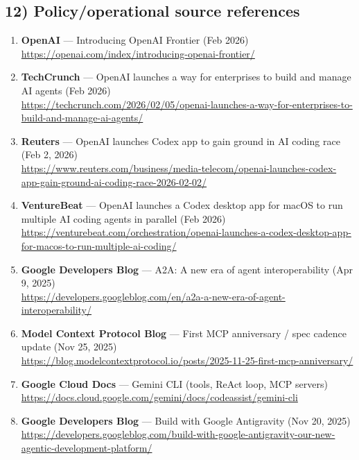 \documentclass[11pt]{article}
\begin{document}
\hypertarget{policyoperational-source-references}{%
\subsection{12) Policy/operational source
references}\label{policyoperational-source-references}}

\begin{enumerate}
\def\labelenumi{\arabic{enumi}.}
\tightlist
\item
  \textbf{OpenAI} --- Introducing OpenAI Frontier (Feb 2026)\\
  \url{https://openai.com/index/introducing-openai-frontier/}
\item
  \textbf{TechCrunch} --- OpenAI launches a way for enterprises to build
  and manage AI agents (Feb 2026)\\
  \url{https://techcrunch.com/2026/02/05/openai-launches-a-way-for-enterprises-to-build-and-manage-ai-agents/}
\item
  \textbf{Reuters} --- OpenAI launches Codex app to gain ground in AI
  coding race (Feb 2, 2026)\\
  \url{https://www.reuters.com/business/media-telecom/openai-launches-codex-app-gain-ground-ai-coding-race-2026-02-02/}
\item
  \textbf{VentureBeat} --- OpenAI launches a Codex desktop app for macOS
  to run multiple AI coding agents in parallel (Feb 2026)\\
  \url{https://venturebeat.com/orchestration/openai-launches-a-codex-desktop-app-for-macos-to-run-multiple-ai-coding/}
\item
  \textbf{Google Developers Blog} --- A2A: A new era of agent
  interoperability (Apr 9, 2025)\\
  \url{https://developers.googleblog.com/en/a2a-a-new-era-of-agent-interoperability/}
\item
  \textbf{Model Context Protocol Blog} --- First MCP anniversary / spec
  cadence update (Nov 25, 2025)\\
  \url{https://blog.modelcontextprotocol.io/posts/2025-11-25-first-mcp-anniversary/}
\item
  \textbf{Google Cloud Docs} --- Gemini CLI (tools, ReAct loop, MCP
  servers)\\
  \url{https://docs.cloud.google.com/gemini/docs/codeassist/gemini-cli}
\item
  \textbf{Google Developers Blog} --- Build with Google Antigravity (Nov
  20, 2025)\\
  \url{https://developers.googleblog.com/build-with-google-antigravity-our-new-agentic-development-platform/}

\end{enumerate}
\end{document}
